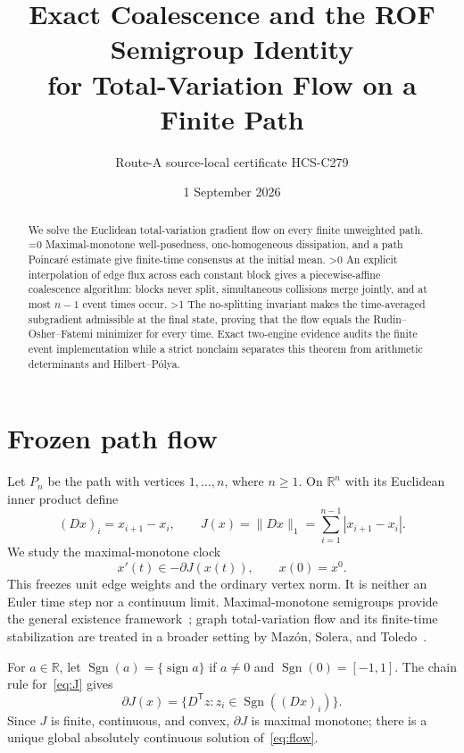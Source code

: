 \documentclass[10pt]{article}
\title{Exact Coalescence and the ROF Semigroup Identity\\
for Total-Variation Flow on a Finite Path}
\author{Route-A source-local certificate HCS-C279}
\date{1 September 2026}
\providecommand{\CRevisionRound}{2}
\newcommand{\R}{\mathbb{R}}
\newcommand{\Sgn}{\operatorname{Sgn}}
\begin{document}
\maketitle

\begin{abstract}
We solve the Euclidean total-variation gradient flow on every finite
unweighted path.
\ifnum\CRevisionRound=0
Maximal-monotone well-posedness, one-homogeneous dissipation, and a path
Poincar\'e estimate give finite-time consensus at the initial mean.
\fi
\ifnum\CRevisionRound>0
An explicit interpolation of edge flux across each constant block gives a
piecewise-affine coalescence algorithm: blocks never split, simultaneous
collisions merge jointly, and at most $n-1$ event times occur.
\fi
\ifnum\CRevisionRound>1
The no-splitting invariant makes the time-averaged subgradient admissible at
the final state, proving that the flow equals the Rudin--Osher--Fatemi
minimizer for every time.  Exact two-engine evidence audits the finite event
implementation while a strict nonclaim separates this theorem from arithmetic
determinants and Hilbert--P\'olya.
\fi
\end{abstract}

\section{Frozen path flow}
Let $P_n$ be the path with vertices $1,\ldots,n$, where $n\geq1$.  On
$\R^n$ with its Euclidean inner product define
\begin{equation}\label{eq:J}
 (Dx)_i=x_{i+1}-x_i,\qquad
 J(x)=\lVert Dx\rVert_1=\sum_{i=1}^{n-1}|x_{i+1}-x_i|.
\end{equation}
We study the maximal-monotone clock
\begin{equation}\label{eq:flow}
 x'(t)\in-\partial J(x(t)),\qquad x(0)=x^0.
\end{equation}
This freezes unit edge weights and the ordinary vertex norm.  It is neither an
Euler time step nor a continuum limit.  Maximal-monotone semigroups provide
the general existence framework~\cite{Brezis1973}; graph total-variation flow
and its finite-time stabilization are treated in a broader setting by
Maz\'on, Solera, and Toledo~\cite{MST2020}.

For $a\in\R$, let $\Sgn(a)=\{\operatorname{sign}a\}$ if $a\ne0$ and
$\Sgn(0)=[-1,1]$.  The chain rule for~\eqref{eq:J} gives
\begin{equation}\label{eq:subgrad}
 \partial J(x)=\{D^{\mathsf T}z:z_i\in\Sgn((Dx)_i)\}.
\end{equation}
Since $J$ is finite, continuous, and convex, $\partial J$ is maximal monotone;
there is a unique global absolutely continuous solution of~\eqref{eq:flow}.
\end{document}

